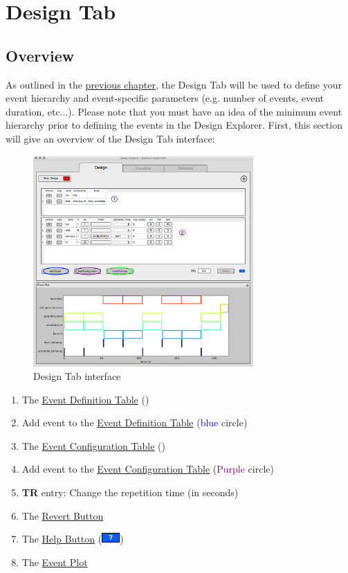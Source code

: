 \documentclass[10pt]{article}
\newcommand*\circled[1]{\tikz[baseline=(char.base)]{
            \node[shape=circle,draw,inner sep=.5pt] (char) {#1};}}
\newcommand*{\hbut}{\includegraphics[scale=0.45]{fig/0_help.jpg}}
\begin{document}
\newpage
\section{Design Tab}
\label{sec:design}
	\subsection{Overview}
	\label{subsec:doverview}
		As outlined in the \hyperref[subsubsec:design]{previous chapter}, the Design Tab will be used to define your event hierarchy and event-specific parameters (e.g. number of events, event duration, etc...).
		Please note that you must have an idea of the minimum event hierarchy prior to defining the events in the Design Explorer.
		First, this section will give an overview of the Design Tab interface:

		\begin{figure}[ht]
			\centering
			\includegraphics[width=0.75\textwidth,frame]{fig/3_design_full.jpg}
			\caption{Design Tab interface}
			\label{fig:design_over}
		\end{figure}

		\begin{enumerate}
			\item The \hyperref[subsec:event_table]{Event Definition Table} (\textcolor{blue}{\circled{1}})
			\item Add event to the \hyperref[subsec:event_table]{Event Definition Table} (\textcolor{blue}{blue} circle)
			\item The \hyperref[subsec:event_config]{Event Configuration Table} (\textcolor{Purple}{\circled{2}})
			\item Add event to the \hyperref[subsec:event_config]{Event Configuration Table} (\textcolor{Purple}{Purple} circle)
			\item \textbf{TR} entry: Change the repetition time (in seconds)
			\item The \hyperref[subsubsec:revert]{Revert Button}
			\item The \hyperref[subsubsec:hbut]{Help Button} (\hbut{})
			\item The \hyperref[subsec:event_plot]{Event Plot}
		\end{enumerate}
\end{document}

